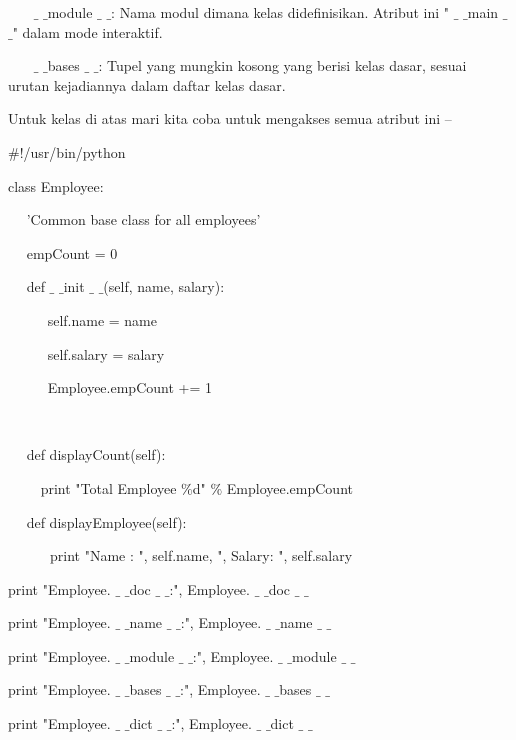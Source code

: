 ~~~  $  \_  $ $  \_  $module $  \_  $ $  \_  $: Nama modul dimana kelas didefinisikan. Atribut ini " $  \_  $ $  \_  $main $  \_  $ $  \_  $" dalam mode interaktif. \par
\vspace{12pt}
~~~  $  \_  $ $  \_  $bases $  \_  $ $  \_  $: Tupel yang mungkin kosong yang berisi kelas dasar, sesuai urutan kejadiannya dalam daftar kelas dasar. \par
\vspace{12pt}
Untuk kelas di atas mari kita coba untuk mengakses semua atribut ini – \par
 $  \#  $!/usr/bin/python \par
\vspace{12pt}
class Employee: \par
~~ 'Common base class for all employees' \par
~~ empCount = 0 \par
\vspace{12pt}
~~ def  $  \_  $ $  \_  $init $  \_  $ $  \_  $(self, name, salary): \par
~~~~~ self.name = name \par
~~~~~ self.salary = salary \par
~~~~~ Employee.empCount += 1 \par
~~  \par
~~ def displayCount(self): \par
~~~~ print "Total Employee  $  \%  $d"  $  \%  $ Employee.empCount \par
\vspace{12pt}
~~ def displayEmployee(self): \par
~~~~~~print "Name : ", self.name,  ", Salary: ", self.salary \par
\vspace{12pt}
print "Employee. $  \_  $ $  \_  $doc $  \_  $ $  \_  $:", Employee. $  \_  $ $  \_  $doc $  \_  $ $  \_  $ \par
print "Employee. $  \_  $ $  \_  $name $  \_  $ $  \_  $:", Employee. $  \_  $ $  \_  $name $  \_  $ $  \_  $ \par
print "Employee. $  \_  $ $  \_  $module $  \_  $ $  \_  $:", Employee. $  \_  $ $  \_  $module $  \_  $ $  \_  $ \par
print "Employee. $  \_  $ $  \_  $bases $  \_  $ $  \_  $:", Employee. $  \_  $ $  \_  $bases $  \_  $ $  \_  $ \par
print "Employee. $  \_  $ $  \_  $dict $  \_  $ $  \_  $:", Employee. $  \_  $ $  \_  $dict $  \_  $ $  \_  $ \par

